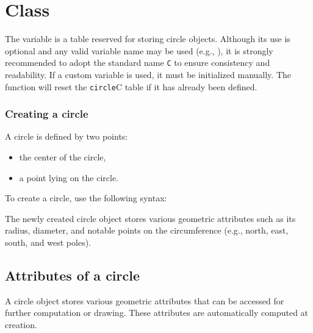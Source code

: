 \newpage
\section{Class }

The  variable is a table reserved for storing circle objects. Although its use is optional and any valid variable name may be used (e.g., ), it is strongly recommended to adopt the standard name \texttt{C} to ensure consistency and readability. If a custom variable is used, it must be initialized manually. The  function will reset the \texttt{circle}{C} table if it has already been defined.


\subsubsection{Creating a circle}
\label{ssub:creating_a_circle}
A circle is defined by two points:
\begin{itemize}
\item the center of the circle,
\item a point lying on the circle.
\end{itemize}
\vspace{0.5em}

To create a circle, use the following syntax:
\begin{mybox}
\end{mybox}

The newly created circle object stores various geometric attributes such as its radius, diameter, and notable points on the circumference (e.g., north, east, south, and west poles).

\subsection{Attributes of a circle}

A circle object stores various geometric attributes that can be accessed for further computation or drawing. These attributes are automatically computed at creation.

\vspace{1em}

